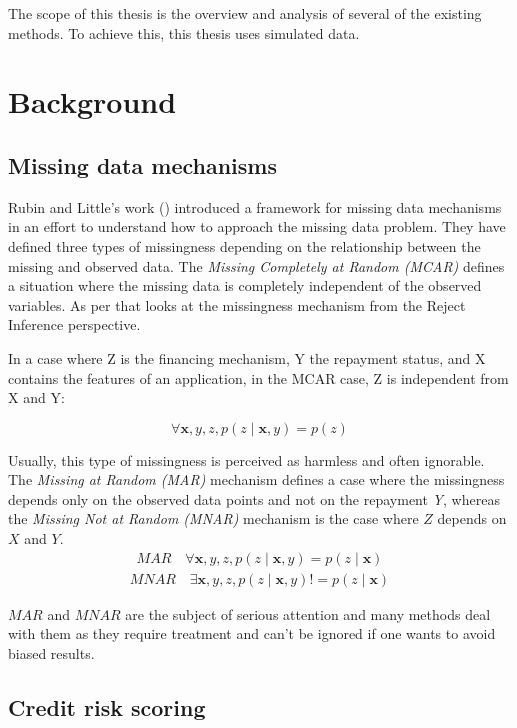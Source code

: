 \documentclass[11pt,a4paper]{article}
\begin{document}
The scope of this thesis is the overview and analysis of several of the existing methods. To achieve this, this thesis uses simulated data.


\section{Background}


\subsection{Missing data mechanisms}

Rubin and Little's work (\cite{rubin1987multiple,rubin1976inference}) introduced a framework for missing data mechanisms in an effort to understand how to approach the missing data problem. They have defined three types of missingness depending on the relationship between the missing and observed data. The \textit{Missing Completely at Random (MCAR)} defines a situation where the missing data is completely independent of the observed variables. As per  \cite{ehrhardt_reject_2021} that looks at the missingness mechanism from the Reject Inference perspective. 

In a case where Z is the financing mechanism, Y the repayment status, and X contains the features of an application, in the MCAR case, Z is independent from X and Y: 

$$
\forall \boldsymbol{x}, y, z, p(z \mid \boldsymbol{x}, y)=p(z)
$$

Usually, this type of missingness is perceived as harmless and often ignorable. 
The \textit{Missing at Random (MAR)} mechanism defines a case where the missingness depends only on the observed data points and not on the repayment \textit{Y}, whereas the \textit{Missing Not at Random (MNAR)} mechanism is the case where $Z$ depends on $X$ and $Y$. 
$$
\begin{aligned}
MAR \quad
\forall \boldsymbol{x}, y, z, p(z \mid \boldsymbol{x}, y)=p(z\mid \boldsymbol{x})
\end{aligned}
$$
$$
\begin{aligned}
MNAR \quad
\exists \boldsymbol{x}, y, z, p(z \mid \boldsymbol{x}, y)!=p(z\mid \boldsymbol{x})
\end{aligned}
$$

$MAR$ and $MNAR$ are the subject of serious attention and many methods deal with them as they require treatment and can’t be ignored if one wants to avoid biased results. 

\subsection{Credit risk scoring}
\end{document}
